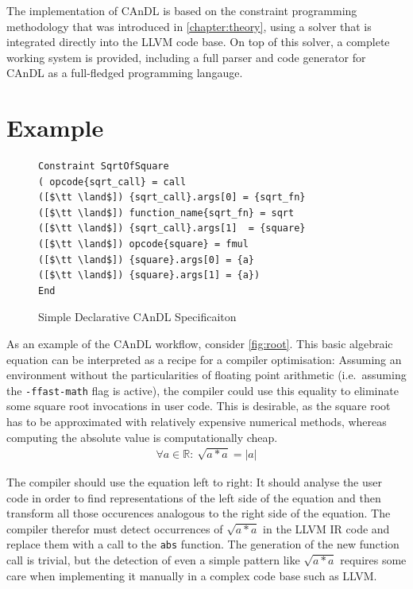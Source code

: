     The implementation of CAnDL is based on the constraint programming
    methodology that was introduced in \autoref{chapter:theory}, using a solver
    that is integrated directly into the LLVM code base.
    On top of this solver, a complete working system is provided, including a
    full parser and code generator for CAnDL as a full-fledged programming
    langauge.

\section{Example}

\begin{figure}[b]
\centering
\caption{Simple Declarative CAnDL Specificaiton}
\label{fig:candlspec}
\begin{minipage}[t]{0.67\textwidth}
\begin{lstlisting}[language=CAnDL]
Constraint SqrtOfSquare
( opcode{sqrt_call} = call
([$\tt \land$]) {sqrt_call}.args[0] = {sqrt_fn}
([$\tt \land$]) function_name{sqrt_fn} = sqrt
([$\tt \land$]) {sqrt_call}.args[1]  = {square}
([$\tt \land$]) opcode{square} = fmul
([$\tt \land$]) {square}.args[0] = {a}
([$\tt \land$]) {square}.args[1] = {a})
End
\end{lstlisting}
\end{minipage}
\end{figure}

    As an example of the CAnDL workflow, consider  \autoref{fig:root}.
    This basic algebraic equation can be interpreted as a recipe for a compiler
    optimisation:
    Assuming an environment without the particularities of floating point
    arithmetic (i.e.\ assuming the \texttt{-ffast-math} flag is active), the
    compiler could use this equality to eliminate some square root invocations
    in user code.
    This is desirable, as the square root has to be approximated with relatively
    expensive numerical methods, whereas computing the absolute value is
    computationally cheap.
    \begin{align}
    \label{fig:root}
    \forall a\in \mathbb{R}\colon\ \sqrt{a*a}=|a|
    \end{align}

    The compiler should use the equation left to right:
    It should analyse the user code in order to find representations of  the
    left side of the equation and then transform all those occurences analogous
    to the right side of the equation.
    The compiler therefor must detect occurrences of $\sqrt{a*a}$ in the LLVM IR
    code and replace them with a call to the \texttt{abs} function.
    The generation of the new function call is trivial, but the detection of
    even a simple pattern like $\sqrt{a*a}$ requires some care when implementing
    it manually in a complex code base such as LLVM.

